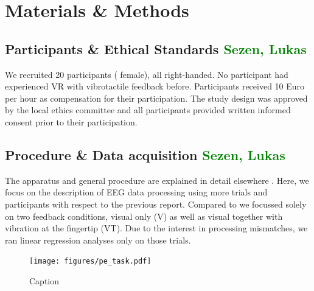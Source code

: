 \section{Materials \& Methods}
\subsection{Participants \& Ethical Standards \textcolor{green}{Sezen, Lukas}}
We recruited 20 participants ( female), all right-handed. No participant had experienced VR with vibrotactile feedback before. Participants received 10 Euro per hour as compensation for their participation. The study design was approved by the local ethics committee and all participants provided written informed consent prior to their participation. 

\subsection{Procedure \& Data acquisition \textcolor{green}{Sezen, Lukas}}
The apparatus and general procedure are explained in detail elsewhere \citep{Gehrke_2019}. Here, we focus on the description of EEG data processing using more trials and participants with respect to the previous report. Compared to \citep{Gehrke_2019} we focussed solely on two feedback conditions, visual only (V) as well as visual together with vibration at the fingertip (VT). Due to the interest in processing mismatches, we ran linear regression analyses only on those trials.


\begin{figure}
    \centering
    \texttt{[image: figures/pe\_task.pdf]}
    \caption{Caption}
    \label{fig:my_label}
\end{figure}


